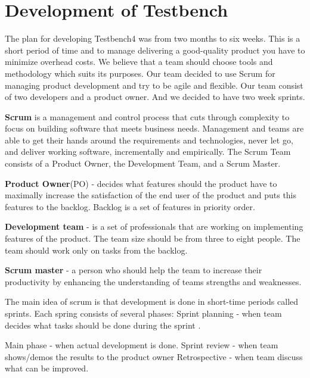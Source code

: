 \chapter{Development of Testbench}
\label{ch:testbenchdevelop}
  
  The plan for developing Testbench4 was from two months to six weeks. This is
    a short period of time and to manage delivering a good-quality product you
    have to minimize overhead costs. We believe that a team should choose tools
    and methodology which suits its purposes. 
    Our team decided to use Scrum for managing product development and try to be agile and flexible.
    Our team consist of two developers and a product owner. And we decided to
    have two week sprints.

    \textbf{Scrum} is a management and control process that cuts through
    complexity to focus on building software that meets business needs. Management and teams are able to get their
    hands around the requirements and technologies, never let go, and deliver working software,
    incrementally and empirically. The Scrum Team consists of a Product Owner,
    the Development Team, and a Scrum Master.
    
  \textbf{Product Owner}(PO) - decides what features should the product have to
  maximally increase the satisfaction of the end user of the product and puts this features to the backlog.
  Backlog is a set of features in priority order.
  
  \textbf{Development team} - is
  a set of professionals that are working on implementing features of the product. 
  The team size should be from three to eight people. The team should work only on tasks from the backlog.
  
  \textbf{Scrum master} - a person who should help the team to increase their
  productivity by enhancing the understanding of teams strengths and weaknesses.

  The main idea of scrum is that development is done in short-time periods
  called sprints. Each spring consists of several phases:
  Sprint planning - when team decides what tasks should be done during the
  sprint .

  Main phase - when actual development is done.
  Sprint review - when team shows/demos the results to the product owner
  Retrospective - when team discuss what can be improved.


